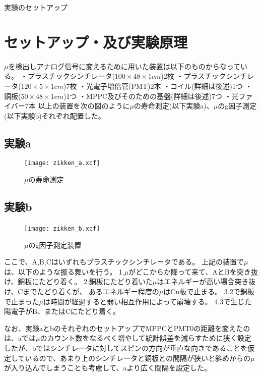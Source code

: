 実験のセットアップ
\section{セットアップ・及び実験原理}
$\mu$を検出しアナログ信号に変えるために用いた装置は以下のものからなっている。
・プラスチックシンチレータ($100\times 48\times 1cm$)2枚
・プラスチックシンチレータ($120\times 5\times 1cm$)7枚
・光電子増倍管(PMT)2本
・コイル(詳細は後述)1つ
・銅板($50\times 48\times 1cm$)1つ
・MPPC及びそのための基盤(詳細は後述)7つ
・光ファイバー7本
以上の装置を次の図のように$\mu$の寿命測定(以下実験a)、$\mu$のg因子測定(以下実験b)それぞれ配置した。
\subsection{実験a}
\begin{figure}[h]
  \texttt{[image: zikken\_a.xcf]}
  \caption{$\mu$の寿命測定}
\end{figure}
\subsection{実験b}
\begin{figure}[h]
  \texttt{[image: zikken\_b.xcf]}
　\caption{$\mu$のg因子測定装置}
\end{figure}
ここで、A,B,Cはいずれもプラスチックシンチレータである。
上記の装置で$\mu$は、以下のような振る舞いを行う。
1.$\mu$がどこからか降って来て、AとBを突き抜け、銅板にたどり着く。
2.銅板にたどり着いた$\mu$はエネルギーが高い場合突き抜け、Cまでたどり着くが、
あるエネルギー程度の$\mu$はCu板で止まる。
3.2で銅板で止まった$\mu$は時間が経過すると弱い相互作用によって崩壊する。
4.3で生じた陽電子がB、またはCにたどり着く。

なお、実験aとbのそれぞれのセットアップでMPPCとPMT0の距離を変えたのは、aでは$\mu$のカウント数をなるべく増やして統計誤差を減らすために狭く設定したが、bではシンチレータに対してスピンの方向が垂直な向きであることを仮定しているので、あまり上のシンチレータと銅板との間隔が狭いと斜めからの$\mu$が入り込んでしまうことも考慮して、aより広く間隔を設定した。
